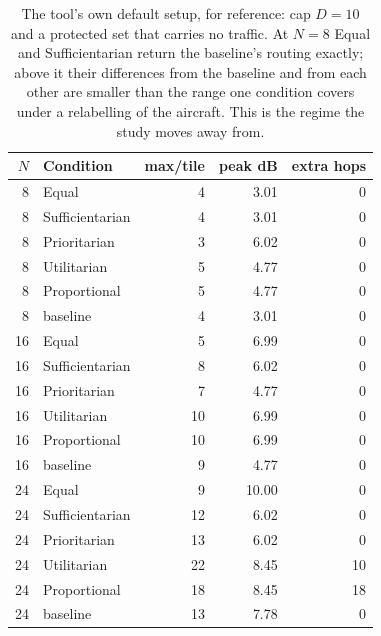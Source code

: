 \begin{table}[t]
\centering
\caption{The tool's own default setup, for reference: cap $D{=}10$ and a protected set that carries no traffic. At $N{=}8$ Equal and Sufficientarian return the baseline's routing exactly; above it their differences from the baseline and from each other are smaller than the range one condition covers under a relabelling of the aircraft. This is the regime the study moves away from.}
\label{tab:reference}
\begin{tabular}{r l rrr}
\toprule
$N$ & Condition & max/tile & peak dB & extra hops \\
\midrule
8 & Equal & 4 & 3.01 & 0 \\
8 & Sufficientarian & 4 & 3.01 & 0 \\
8 & Prioritarian & 3 & 6.02 & 0 \\
8 & Utilitarian & 5 & 4.77 & 0 \\
8 & Proportional & 5 & 4.77 & 0 \\
8 & baseline & 4 & 3.01 & 0 \\
16 & Equal & 5 & 6.99 & 0 \\
16 & Sufficientarian & 8 & 6.02 & 0 \\
16 & Prioritarian & 7 & 4.77 & 0 \\
16 & Utilitarian & 10 & 6.99 & 0 \\
16 & Proportional & 10 & 6.99 & 0 \\
16 & baseline & 9 & 4.77 & 0 \\
24 & Equal & 9 & 10.00 & 0 \\
24 & Sufficientarian & 12 & 6.02 & 0 \\
24 & Prioritarian & 13 & 6.02 & 0 \\
24 & Utilitarian & 22 & 8.45 & 10 \\
24 & Proportional & 18 & 8.45 & 18 \\
24 & baseline & 13 & 7.78 & 0 \\
\bottomrule
\end{tabular}
\end{table}
